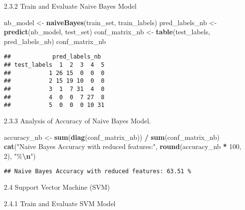 \documentclass[
]{article}
\newenvironment{Shaded}{\begin{snugshade}}{\end{snugshade}}
\newcommand{\AttributeTok}[1]{\textcolor[rgb]{0.13,0.29,0.53}{#1}}
\newcommand{\ConstantTok}[1]{\textcolor[rgb]{0.56,0.35,0.01}{#1}}
\newcommand{\DecValTok}[1]{\textcolor[rgb]{0.00,0.00,0.81}{#1}}
\newcommand{\FloatTok}[1]{\textcolor[rgb]{0.00,0.00,0.81}{#1}}
\newcommand{\FunctionTok}[1]{\textcolor[rgb]{0.13,0.29,0.53}{\textbf{#1}}}
\newcommand{\NormalTok}[1]{#1}
\newcommand{\OtherTok}[1]{\textcolor[rgb]{0.56,0.35,0.01}{#1}}
\newcommand{\SpecialCharTok}[1]{\textcolor[rgb]{0.81,0.36,0.00}{\textbf{#1}}}
\newcommand{\StringTok}[1]{\textcolor[rgb]{0.31,0.60,0.02}{#1}}
\begin{document}
2.3.2 Train and Evaluate Naive Bayes Model

\begin{Shaded}
\begin{Highlighting}[]
\NormalTok{nb\_model }\OtherTok{\textless{}{-}} \FunctionTok{naiveBayes}\NormalTok{(train\_set, train\_labels)}
\NormalTok{pred\_labels\_nb }\OtherTok{\textless{}{-}} \FunctionTok{predict}\NormalTok{(nb\_model, test\_set)}
\NormalTok{conf\_matrix\_nb }\OtherTok{\textless{}{-}} \FunctionTok{table}\NormalTok{(test\_labels, pred\_labels\_nb)}
\NormalTok{conf\_matrix\_nb}
\end{Highlighting}
\end{Shaded}

\begin{verbatim}
##            pred_labels_nb
## test_labels  1  2  3  4  5
##           1 26 15  0  0  0
##           2 15 19 10  0  0
##           3  1  7 31  4  0
##           4  0  0  7 27  8
##           5  0  0  0 10 31
\end{verbatim}

2.3.3 Analysis of Accuracy of Naive Bayes Model.

\begin{Shaded}
\begin{Highlighting}[]
\NormalTok{accuracy\_nb }\OtherTok{\textless{}{-}} \FunctionTok{sum}\NormalTok{(}\FunctionTok{diag}\NormalTok{(conf\_matrix\_nb)) }\SpecialCharTok{/} \FunctionTok{sum}\NormalTok{(conf\_matrix\_nb)}
\FunctionTok{cat}\NormalTok{(}\StringTok{"Naive Bayes Accuracy with reduced features:"}\NormalTok{, }\FunctionTok{round}\NormalTok{(accuracy\_nb }\SpecialCharTok{*} \DecValTok{100}\NormalTok{, }\DecValTok{2}\NormalTok{), }\StringTok{"\%}\SpecialCharTok{\textbackslash{}n}\StringTok{"}\NormalTok{)}
\end{Highlighting}
\end{Shaded}

\begin{verbatim}
## Naive Bayes Accuracy with reduced features: 63.51 %
\end{verbatim}

2.4 Support Vector Machine (SVM)

2.4.1 Train and Evaluate SVM Model

\begin{Shaded}
\end{Shaded}
\end{document}

